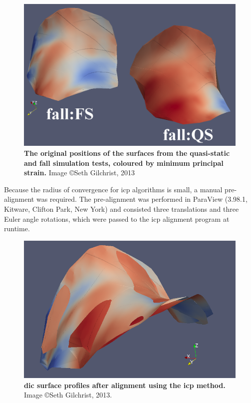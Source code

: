 \begin{figure}
\centering
\includegraphics[width=0.7\linewidth]{./fracture/Figures/Original}
\caption[Original positions of the \acs*{dic} surfaces]{\textbf{The original positions of the surfaces from the quasi-static and fall simulation tests, coloured by minimum principal strain.} Image \copyright Seth Gilchrist, 2013}
\label{fig:OriginalPositions}
\end{figure}

Because the radius of convergence for \ac{icp} algorithms is small, a manual pre-alignment was required.
The pre-alignment was performed in ParaView (3.98.1, Kitware, Clifton Park, New York) and consisted three translations and three Euler angle rotations, which were passed to the \ac{icp} alignment program at runtime.

\begin{figure}
\centering
\includegraphics[width=0.7\linewidth]{./fracture/Figures/Aligned}
\caption[\acs*{dic} surfaces aligned after \acs*{icp}]{\textbf{\acs{dic} surface profiles after alignment using the \acs{icp} method.} Image \copyright Seth Gilchrist, 2013.}
\label{fig:AlignedPositions}
\end{figure}

